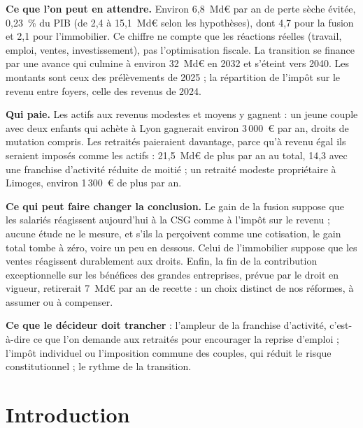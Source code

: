 \documentclass[11pt,a4paper]{article}
\begin{document}
\textbf{Ce que l'on peut en attendre.} Environ 6,8~Md€ par an de perte sèche évitée, 0,23~\% du PIB (de 2,4 à
15,1~Md€ selon les hypothèses), dont 4,7 pour la fusion et 2,1 pour l'immobilier. Ce chiffre ne compte que les
réactions réelles (travail, emploi, ventes, investissement), pas l'optimisation fiscale. La transition se finance par
une avance qui culmine à environ 32~Md€ en 2032 et s'éteint vers 2040. Les montants sont ceux des prélèvements de
2025 ; la répartition de l'impôt sur le revenu entre foyers, celle des revenus de 2024.

\textbf{Qui paie.} Les actifs aux revenus modestes et moyens y gagnent : un jeune couple avec deux enfants qui achète
à Lyon gagnerait environ 3\,000~€ par an, droits de mutation compris. Les retraités paieraient davantage, parce qu'à
revenu égal ils seraient imposés comme les actifs : 21,5~Md€ de plus par an au total, 14,3 avec une franchise
d'activité réduite de moitié ; un retraité modeste propriétaire à Limoges, environ 1\,300~€ de plus par an.

\textbf{Ce qui peut faire changer la conclusion.} Le gain de la fusion suppose que les salariés réagissent aujourd'hui
à la CSG comme à l'impôt sur le revenu ; aucune étude ne le mesure, et s'ils la perçoivent comme une cotisation, le gain
total tombe à zéro, voire un peu en dessous. Celui de l'immobilier suppose que les ventes réagissent durablement aux droits. Enfin, la fin de la
contribution exceptionnelle sur les bénéfices des grandes entreprises, prévue par le droit en vigueur, retirerait
7~Md€ par an de recette : un choix distinct de nos réformes, à assumer ou à compenser.

\textbf{Ce que le décideur doit trancher} : l'ampleur de la franchise d'activité, c'est-à-dire ce que l'on demande
aux retraités pour encourager la reprise d'emploi ; l'impôt individuel ou l'imposition commune des couples, qui
réduit le risque constitutionnel ; le rythme de la transition.

\clearpage
{\setcounter{tocdepth}{2}\renewcommand{\contentsname}{Sommaire}\tableofcontents}
\clearpage
\section*{Introduction}
\end{document}
